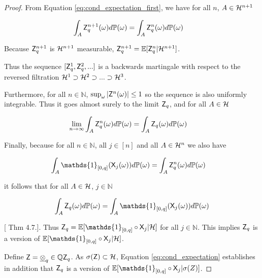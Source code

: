 \begin{proof}
From Equation \ref{eq:cond_expectation_first}, we have for all $n$, $A\in \mathcal{H}^{n+1}$

\begin{align}
    \int_{A} \mathsf{Z}_q^{n+1} (\omega) d\mathbb{P}(\omega) &= \int_{A} \mathsf{Z}_q^{n} (\omega) d\mathbb{P}(\omega)
\end{align}

Because $\mathsf{Z}_q^{n+1}$ is $\mathcal{H}^{n+1}$ measurable, $\mathsf{Z}_q^{n+1} = \mathbb{E}[\mathsf{Z}_q^{n}|\mathcal{H}^{n+1}]$.

Thus the sequence $[\mathsf{Z}^1_q,\mathsf{Z}^2_q,...]$ is a backwards martingale with respect to the reversed filtration $\mathcal{H}^1\supset\mathcal{H}^2\supset...\supset \mathcal{H}^3$.

Furthermore, for all $n\in \mathbb{N}$, $\sup_\omega|\mathsf{Z}^n(\omega)|\leq 1$ so the sequence is also uniformly integrable. Thus it goes almost surely to the limit $\mathsf{Z}_q$, and for all $A\in \mathcal{H}$

\begin{align}
    \lim_{n\to\infty} \int_A \mathsf{Z}^n_q(\omega) d\mathbb{P}(\omega) &= \int_A \mathsf{Z}_q(\omega) d\mathbb{P}(\omega)
\end{align}

Finally, because for all $n\in \mathbb{N}$, all $j\in[n]$ and all $A\in \mathcal{H}^n$ we also have

\begin{align}
    \int_A \mathds{1}_{[0,q]}(\RV{X}_j(\omega))d\prob{P}(\omega) &= \int_A \RV{Z}_q^n(\omega) d\prob{P}(\omega)
\end{align}

it follows that for all $A\in \mathcal{H}$, $j\in \mathbb{N}$

\begin{align}
    \int_A \RV{Z}_q(\omega) d\prob{P}(\omega) = \int_A \mathds{1}_{[0,q]}(\RV{X}_j(\omega))d\prob{P}(\omega)\label{eq:cond_expectation}
\end{align}

[\citet{cinlar_probability_2011} Thm 4.7.]. Thus $\RV{Z}_q = \mathbb{E}[\mathds{1}_{[0,q]}\circ\RV{X}_j|\sigalg{H}]$ for all $j\in \mathbb{N}$. This implies $\mathsf{Z}_q$ is a version of $\mathbb{E}[\mathds{1}_{[0,q]}\circ \RV{X}_j|\sigalg{H}]$.

Define $\mathsf{Z} = \underline{\otimes}_q\in \mathbb{Q} \mathsf{Z}_q$. As $\sigma(\mathsf{Z})\subset\mathcal{H}$, Equation \ref{eq:cond_expectation} establishes in addition that $\mathsf{Z}_q$ is a version of $\mathbb{E}[\mathds{1}_{[0,q]}\circ \RV{X}_j|\sigma(Z)]$. 


\end{proof}
